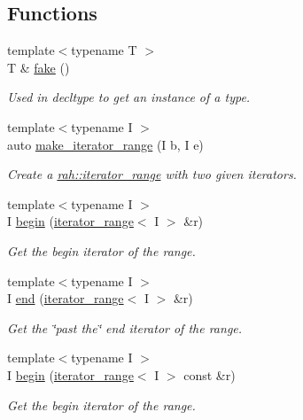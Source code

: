 \subsection*{Functions}
\begin{DoxyCompactItemize}
\item 
{\footnotesize template$<$typename T $>$ }\\T \& \mbox{\hyperlink{namespacerah_a11785bbdf970efa1bc57fc14993b77bf}{fake}} ()
\begin{DoxyCompactList}\small\item\em Used in decltype to get an instance of a type. \end{DoxyCompactList}\item 
{\footnotesize template$<$typename I $>$ }\\auto \mbox{\hyperlink{namespacerah_a4e145bfeb8a932058e20fc4cb4e7c206}{make\+\_\+iterator\+\_\+range}} (I b, I e)
\begin{DoxyCompactList}\small\item\em Create a \mbox{\hyperlink{structrah_1_1iterator__range}{rah\+::iterator\+\_\+range}} with two given iterators. \end{DoxyCompactList}\item 
{\footnotesize template$<$typename I $>$ }\\I \mbox{\hyperlink{namespacerah_a2c4a19e57cc4e0753e93830f247def6d}{begin}} (\mbox{\hyperlink{structrah_1_1iterator__range}{iterator\+\_\+range}}$<$ I $>$ \&r)
\begin{DoxyCompactList}\small\item\em Get the begin iterator of the range. \end{DoxyCompactList}\item 
{\footnotesize template$<$typename I $>$ }\\I \mbox{\hyperlink{namespacerah_aaddd1442cd76b96876e692cdefe7261d}{end}} (\mbox{\hyperlink{structrah_1_1iterator__range}{iterator\+\_\+range}}$<$ I $>$ \&r)
\begin{DoxyCompactList}\small\item\em Get the \char`\"{}past the\char`\"{} end iterator of the range. \end{DoxyCompactList}\item 
{\footnotesize template$<$typename I $>$ }\\I \mbox{\hyperlink{namespacerah_a14e69321e6772651b349cb31467ea3a2}{begin}} (\mbox{\hyperlink{structrah_1_1iterator__range}{iterator\+\_\+range}}$<$ I $>$ const \&r)
\begin{DoxyCompactList}\small\item\em Get the begin iterator of the range. \end{DoxyCompactList}\item 

\end{DoxyCompactItemize}
